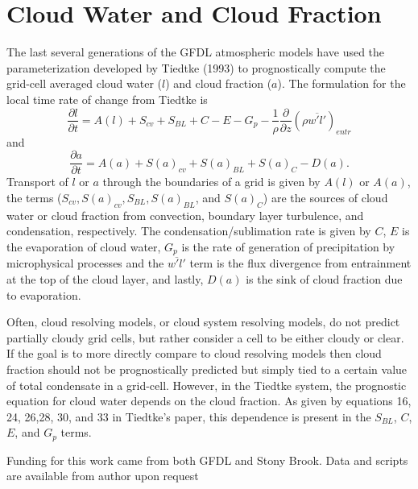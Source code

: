 \documentclass[draft]{agujournal2019}
\begin{document}
\section{Cloud Water and Cloud Fraction}

The last several generations of the GFDL atmospheric models have used the parameterization developed by Tiedtke (1993) to prognostically compute the grid-cell averaged cloud water ($l$) and cloud fraction ($a$).  The formulation for the local time rate of change from Tiedtke is 
\begin{equation}
  \frac{\partial l}{\partial t} = A(l)+S_{cv}+S_{BL}+C-E-G_{p}-\frac{1}{\rho}\frac{\partial}{\partial z}(\rho\overline{w'l'})_{entr}
\end{equation}
and 
\begin{equation}
  \frac{\partial a}{\partial t} = A(a)+S(a)_{cv}+S(a)_{BL}+S(a)_C-D(a).
\end{equation}
Transport of $l$ or $a$ through the boundaries of a grid is given by $A(l)$ or $A(a)$, the terms ($S_{cv}, S(a)_{cv}, S_{BL}, S(a)_{BL}$, and $S(a)_C$) are the sources of cloud water or cloud fraction from convection, boundary layer turbulence, and condensation, respectively.  The condensation/sublimation rate is given by $C$, $E$ is the evaporation of cloud water, $G_{p}$ is the rate of generation of precipitation by microphysical processes and the $\overline{w'l'}$ term is the flux divergence from entrainment at the top of the cloud layer, and lastly, $D(a)$ is the sink of cloud fraction due to evaporation.

Often, cloud resolving models, or cloud system resolving models, do not predict partially cloudy grid cells, but rather consider a cell to be either cloudy or clear.  If the goal is to more directly compare to cloud resolving models then cloud fraction should not be prognostically predicted but simply tied to a certain value of total condensate in a grid-cell.  However, in the Tiedtke system, the prognostic equation for cloud water depends on the cloud fraction.  As given by equations 16, 24, 26,28, 30, and 33 in Tiedtke's paper, this dependence is present in the $S_{BL}$, $C$, $E$, and $G_{p}$ terms. 

\acknowledgments
Funding for this work came from both GFDL and Stony Brook.  Data and scripts are available from author upon request



  
\end{document}
